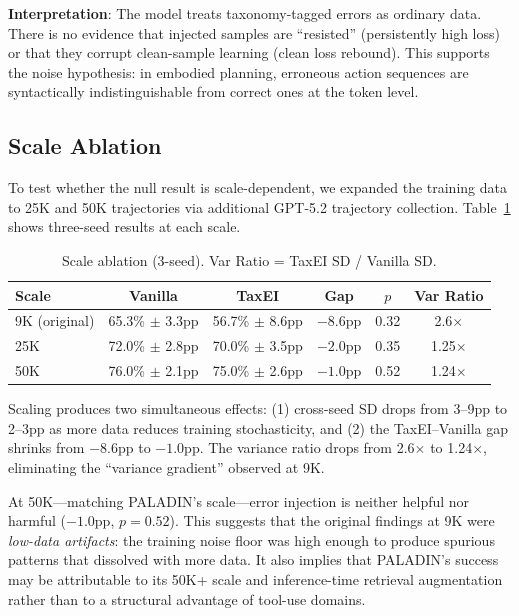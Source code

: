 \documentclass[11pt,a4paper]{article}
\begin{document}
\textbf{Interpretation}: The model treats taxonomy-tagged errors as ordinary data.
There is no evidence that injected samples are ``resisted'' (persistently high loss) or that they corrupt clean-sample learning (clean loss rebound).
This supports the noise hypothesis: in embodied planning, erroneous action sequences are syntactically indistinguishable from correct ones at the token level.

\subsection{Scale Ablation}\label{sec:scale}

To test whether the null result is scale-dependent, we expanded the training data to 25K and 50K trajectories via additional GPT-5.2 trajectory collection.
Table~\ref{tab:scale} shows three-seed results at each scale.

\begin{table}[h]
\centering
\caption{Scale ablation (3-seed). Var Ratio = TaxEI SD / Vanilla SD.}
\label{tab:scale}
\begin{tabular}{lccccc}
\toprule
\textbf{Scale} & \textbf{Vanilla} & \textbf{TaxEI} & \textbf{Gap} & \textbf{$p$} & \textbf{Var Ratio} \\
\midrule
9K (original) & 65.3\% $\pm$ 3.3pp & 56.7\% $\pm$ 8.6pp & $-8.6$pp & 0.32 & 2.6$\times$ \\
25K & 72.0\% $\pm$ 2.8pp & 70.0\% $\pm$ 3.5pp & $-2.0$pp & 0.35 & 1.25$\times$ \\
50K & 76.0\% $\pm$ 2.1pp & 75.0\% $\pm$ 2.6pp & $-1.0$pp & 0.52 & 1.24$\times$ \\
\bottomrule
\end{tabular}
\end{table}

Scaling produces two simultaneous effects: (1) cross-seed SD drops from 3--9pp to 2--3pp as more data reduces training stochasticity, and (2) the TaxEI--Vanilla gap shrinks from $-8.6$pp to $-1.0$pp.
The variance ratio drops from 2.6$\times$ to 1.24$\times$, eliminating the ``variance gradient'' observed at 9K.

At 50K---matching PALADIN's scale---error injection is neither helpful nor harmful ($-1.0$pp, $p{=}0.52$).
This suggests that the original findings at 9K were \emph{low-data artifacts}: the training noise floor was high enough to produce spurious patterns that dissolved with more data.
It also implies that PALADIN's success may be attributable to its 50K+ scale and inference-time retrieval augmentation rather than to a structural advantage of tool-use domains.
\end{document}
